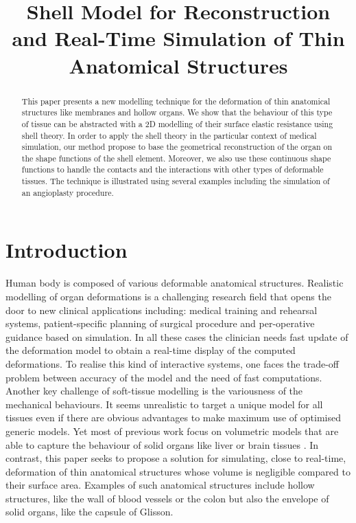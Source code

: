 \documentclass{llncs}
\newcommand{\CD}[1]{{\color{magenta}{\textbf{CD: #1}}}}
\begin{document}
\title{Shell Model for Reconstruction and Real-Time Simulation of Thin Anatomical Structures}

\maketitle

\begin{abstract}
This paper presents a new modelling technique for the deformation of thin anatomical structures like membranes and hollow organs. We show that the behaviour of this type of tissue can be abstracted with a 2D modelling of their surface elastic resistance using shell theory. In order to apply the shell theory in the particular context of medical simulation, our method propose to base the geometrical reconstruction of the organ on the shape functions of the shell element. Moreover, we also use these continuous shape functions to handle the contacts and the interactions with other types of deformable tissues. The technique is illustrated using several examples including the simulation of an angioplasty procedure.
\end{abstract}

\section{Introduction}

Human body is composed of various deformable anatomical structures. Realistic modelling of organ deformations is a challenging research field that opens the door to new clinical applications including: medical training and rehearsal systems, patient-specific planning of surgical procedure and per-operative guidance based on simulation. In all these cases the clinician needs fast update of the deformation model to obtain a real-time display of the computed deformations. To realise this kind of interactive systems, one faces the trade-off problem between accuracy of the model and the need of fast computations. 
Another key challenge of soft-tissue modelling is the variousness of the mechanical behaviours. It seems unrealistic to target a unique model for all tissues even if there are obvious advantages to make maximum use of optimised generic models. Yet most of previous work focus on volumetric models that are able to capture the behaviour of solid organs like liver \cite{} or brain tissues \cite{} \CD{TODO: biblio}. In contrast, this paper seeks to propose a solution for simulating, close to real-time, deformation of thin anatomical structures whose volume is negligible compared to their surface area. Examples of such anatomical structures include hollow structures, like the wall of blood vessels or the colon but also the envelope of solid organs, like the capsule of Glisson.
\end{document}
